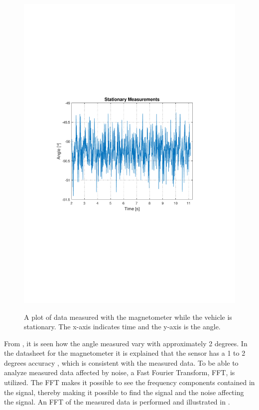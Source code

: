 \begin{figure}[H]
  \centering
  {
    \includegraphics[width=1.1\textwidth]{figures/StationaryMeasurements.pdf}
  }
  \caption{A plot of data measured with the magnetometer while the vehicle is stationary. The x-axis indicates time and the y-axis is the angle.}
  \label{fig:StationaryMeasurementsMagnato}
\end{figure}\vspace{-5mm}

From , it is seen how the angle measured vary with approximately 2 degrees. In the datasheet for the magnetometer it is explained that the sensor has a 1 to 2 degrees accuracy \cite{HMC5883L}, which is consistent with the measured data. To be able to analyze measured data affected by noise, a Fast Fourier Transform, FFT, is utilized. The FFT makes it possible to see the frequency components contained in the signal, thereby making it possible to find the signal and the noise affecting the signal. An FFT of the measured data is performed and illustrated in .

